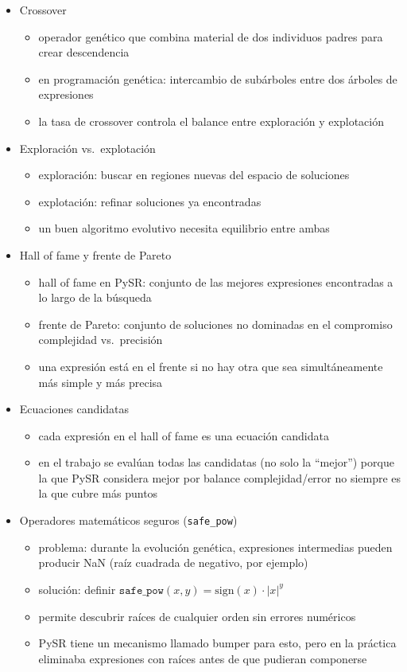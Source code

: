 \documentclass{article}
\begin{document}
\begin{itemize}[leftmargin=1.5em]
  \item Crossover
  \begin{itemize}
\item operador genético que combina material de dos individuos padres para crear descendencia \item en programación genética: intercambio de subárboles entre dos árboles de expresiones \item la tasa de crossover controla el balance entre exploración y explotación
  \end{itemize}

  \item Exploración vs.\ explotación
  \begin{itemize}
\item exploración: buscar en regiones nuevas del espacio de soluciones \item explotación: refinar soluciones ya encontradas \item un buen algoritmo evolutivo necesita equilibrio entre ambas
  \end{itemize}

  \item Hall of fame y frente de Pareto
  \begin{itemize}
\item hall of fame en PySR: conjunto de las mejores expresiones encontradas a lo largo de la búsqueda \item frente de Pareto: conjunto de soluciones no dominadas en el compromiso complejidad vs.\ precisión \item una expresión está en el frente si no hay otra que sea simultáneamente más simple y más precisa
  \end{itemize}

  \item Ecuaciones candidatas
  \begin{itemize}
\item cada expresión en el hall of fame es una ecuación candidata \item en el trabajo se evalúan todas las candidatas (no solo la ``mejor'') porque la que PySR considera mejor por balance complejidad/error no siempre es la que cubre más puntos
  \end{itemize}

  \item Operadores matemáticos seguros (\texttt{safe\_pow})
  \begin{itemize}
\item problema: durante la evolución genética, expresiones intermedias pueden producir NaN (raíz cuadrada de negativo, por ejemplo) \item solución: definir $\texttt{safe\_pow}(x, y) = \text{sign}(x) \cdot |x|^y$ \item permite descubrir raíces de cualquier orden sin errores numéricos \item PySR tiene un mecanismo llamado bumper para esto, pero en la práctica eliminaba expresiones con raíces antes de que pudieran componerse
  \end{itemize}


\end{itemize}
\end{document}

